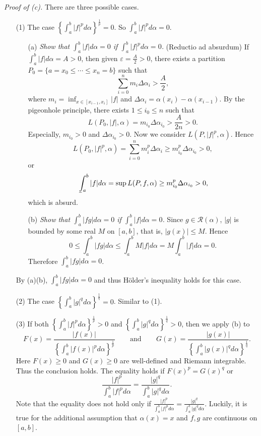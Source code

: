 \documentclass{article}
\def\lowint{\mkern3mu\underline{\vphantom{\intop}\mkern7mu}\mkern-10mu\int}
\begin{document}
\emph{Proof of (c).}
There are three possible cases.
\begin{enumerate}
\item[(1)]
  The case $\left\{ \int_{a}^{b} |f|^p d\alpha \right\}^{\frac{1}{p}} = 0$.
  So $\int_{a}^{b} |f|^p d\alpha = 0$.

  \begin{enumerate}
  \item[(a)]
  \emph{Show that $\int_{a}^{b} |f| d\alpha = 0$ if $\int_{a}^{b} |f|^p d\alpha = 0$.}
  (Reductio ad absurdum)
  If $\int_{a}^{b} |f| d\alpha = A > 0$, then given $\varepsilon = \frac{A}{2} > 0$,
  there exists a partition $P_0 = \{a=x_0 \leq \cdots \leq x_n = b \}$ such that
  \[
    \sum_{i=0}^{n} m_i \Delta \alpha_i > \frac{A}{2},
  \]
  where $m_i = \inf_{x \in [x_{i-1},x_i]} |f|$ and
  $\Delta \alpha_i = \alpha(x_i) - \alpha(x_{i-1})$.
  By the pigeonhole principle,
  there exists $1 \leq i_0 \leq n$
  such that
  \[
    L(P_0,|f|,\alpha) = m_{i_0} \Delta \alpha_{i_0} > \frac{A}{2n} > 0.
  \]
  Especially, $m_{i_0} > 0$ and $\Delta \alpha_{i_0} > 0$.
  Now we consider $L(P,|f|^p,\alpha)$.
  Hence
  \[
    L(P_0,|f|^p,\alpha)
  = \sum_{i=0}^{n} m_i^p \Delta \alpha_i
  \geq m_{i_0}^p \Delta \alpha_{i_0} > 0,
  \]
  or
  \[
    \lowint_{a}^{b}|f|d\alpha = \sup L(P,f,\alpha) \geq m_{i_0}^p \Delta \alpha_{i_0} > 0,
  \]
  which is absurd.

  \item[(b)]
  \emph{Show that $\int_{a}^{b} |fg| d\alpha = 0$ if $\int_{a}^{b} |f| d\alpha = 0$.}
  Since $g \in \mathscr{R}(\alpha)$, $|g|$ is bounded by some real $M$ on $[a,b]$,
  that is, $|g(x)| \leq M$.
  Hence
  \[
    0
  \leq \int_{a}^{b} |fg| d\alpha
  \leq \int_{a}^{b} M|f| d\alpha
  = M \int_{a}^{b}|f| d\alpha
  = 0.
  \]
  Therefore $\int_{a}^{b} |fg| d\alpha = 0$.
  \end{enumerate}
  By (a)(b), $\int_{a}^{b} |fg| d\alpha = 0$
  and thus H\"older's inequality holds for this case.

\item[(2)]
  The case $\left\{ \int_{a}^{b} |g|^q d\alpha \right\}^{\frac{1}{q}} = 0$.
  Similar to (1).

\item[(3)]
  If both
  $\left\{ \int_{a}^{b} |f|^p d\alpha \right\}^{\frac{1}{p}} > 0$
  and
  $\left\{ \int_{a}^{b} |g|^q d\alpha \right\}^{\frac{1}{q}} > 0$,
  then we apply (b)
  to
  \[
    F(x) = \frac{|f(x)|}{\left\{ \int_{a}^{b} |f(x)|^p d\alpha \right\}^{\frac{1}{p}}}
    \:\:\:\:\:\:\:\:
    \text{ and }
    \:\:\:\:\:\:\:\:
    G(x) = \frac{|g(x)|}{\left\{ \int_{a}^{b} |g(x)|^q d\alpha \right\}^{\frac{1}{q}}}.
  \]
  Here $F(x) \geq 0$ and $G(x) \geq 0$ are well-defined and Riemann integrable.
  Thus the conclusion holds.
  The equality holds if $F(x)^p = G(x)^q$
  or
  \[
    \frac{|f|^p}{\int_{a}^{b} |f|^p d\alpha}
    =
    \frac{|g|^q}{\int_{a}^{b} |g|^q d\alpha}.
  \]
  Note that the equality does not hold only if
  $\frac{|f|^p}{\int_{a}^{b} |f|^p d\alpha}
  =
  \frac{|g|^q}{\int_{a}^{b} |g|^q d\alpha}$.
  Luckily, it is true for the additional assumption that
  $\alpha(x) = x$ and $f, g$ are continuous on $[a,b]$.
\end{enumerate}
\end{document}
